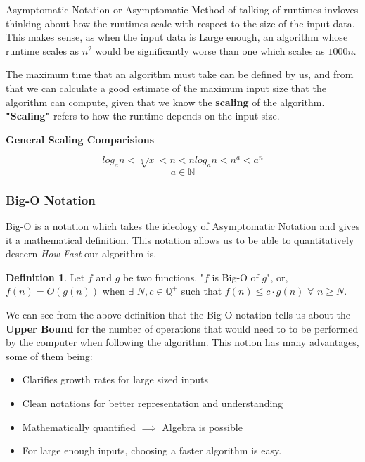 \documentclass{article}
\theoremstyle{definition}
\newtheorem*{definition}{Definition}
\theoremstyle{example}
\begin{document}
\hspace{6mm}Asymptomatic Notation or Asymptomatic Method of talking of runtimes invloves thinking about how the runtimes scale with respect to the size of the input data. This makes sense, as when the input data is Large enough, an algorithm whose runtime scales as $n^2$ would be significantly worse than one which scales as $1000n$.\par
\vspace{5mm}
The maximum time that an algorithm must take can be defined by us, and from that we can calculate a good estimate of the maximum input size that the algorithm can compute, given that we know the \textbf{scaling} of the algorithm. \textbf{"Scaling"} refers to how the runtime depends on the input size.\par
\vspace{3mm}
\begin{center}
    \textbf{General Scaling Comparisions}
\end{center}
\[log_a n < \sqrt[n]{x} < n < n log_a n < n^a < a^n \]
\[a \in \mathbb{N} \]
\newpage
\subsubsection{\Large Big-O Notation}
\hspace{6mm}Big-O is a notation which takes the ideology of Asymptomatic Notation and gives it a mathematical definition. This notation allows us to be able to quantitatively descern \textit{How Fast} our algorithm is.\par
\vspace{4mm}

\theoremstyle{definition}
\begin{definition}{}
    Let $f$ and $g$ be two functions. "$f$ is Big-O of $g$", or, $f(n) = O(g(n))$ when $\exists$ $N, c \in \mathbb{Q}^+$ such that $f(n) \leq c\cdot g(n)$ $\forall$ $n\geq N$.
\end{definition}
\vspace{4mm}

We can see from the above definition that the Big-O notation tells us about the \textbf{Upper Bound} for the number of operations that would need to to be performed by the computer when following the algorithm. This notion has many advantages, some of them being:

\begin{itemize}
    \item Clarifies growth rates for large sized inputs
    \item Clean notations for better representation and understanding
    \item Mathematically quantified $\implies$ Algebra is possible
    \item For large enough inputs, choosing a faster algorithm is easy.
\end{itemize}
\end{document}
